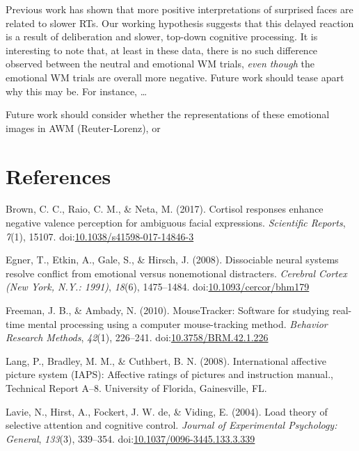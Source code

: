 \documentclass[man]{apa6}
\begin{document}
Previous work has shown that more positive interpretations of surprised faces are related to slower RTs. Our working hypothesis suggests that this delayed reaction is a result of deliberation and slower, top-down cognitive processing. It is interesting to note that, at least in these data, there is no such difference observed between the neutral and emotional WM trials, \emph{even though} the emotional WM trials are overall more negative. Future work should tease apart why this may be. For instance, \ldots{}

Future work should consider whether the representations of these emotional images in AWM (Reuter-Lorenz), or

\newpage

\hypertarget{references}{%
\section{References}\label{references}}

\begingroup
\setlength{\parindent}{-0.5in}
\setlength{\leftskip}{0.5in}

\hypertarget{refs}{}
\leavevmode\hypertarget{ref-brown_cortisol_2017}{}%
Brown, C. C., Raio, C. M., \& Neta, M. (2017). Cortisol responses enhance negative valence perception for ambiguous facial expressions. \emph{Scientific Reports}, \emph{7}(1), 15107. doi:\href{https://doi.org/10.1038/s41598-017-14846-3}{10.1038/s41598-017-14846-3}

\leavevmode\hypertarget{ref-egner_dissociable_2008}{}%
Egner, T., Etkin, A., Gale, S., \& Hirsch, J. (2008). Dissociable neural systems resolve conflict from emotional versus nonemotional distracters. \emph{Cerebral Cortex (New York, N.Y.: 1991)}, \emph{18}(6), 1475--1484. doi:\href{https://doi.org/10.1093/cercor/bhm179}{10.1093/cercor/bhm179}

\leavevmode\hypertarget{ref-freeman_mousetracker:_2010}{}%
Freeman, J. B., \& Ambady, N. (2010). MouseTracker: Software for studying real-time mental processing using a computer mouse-tracking method. \emph{Behavior Research Methods}, \emph{42}(1), 226--241. doi:\href{https://doi.org/10.3758/BRM.42.1.226}{10.3758/BRM.42.1.226}

\leavevmode\hypertarget{ref-lang_international_2008}{}%
Lang, P., Bradley, M. M., \& Cuthbert, B. N. (2008). International affective picture system (IAPS): Affective ratings of pictures and instruction manual., Technical Report A--8. University of Florida, Gainesville, FL.

\leavevmode\hypertarget{ref-lavie_load_2004}{}%
Lavie, N., Hirst, A., Fockert, J. W. de, \& Viding, E. (2004). Load theory of selective attention and cognitive control. \emph{Journal of Experimental Psychology: General}, \emph{133}(3), 339--354. doi:\href{https://doi.org/10.1037/0096-3445.133.3.339}{10.1037/0096-3445.133.3.339}
\end{document}
